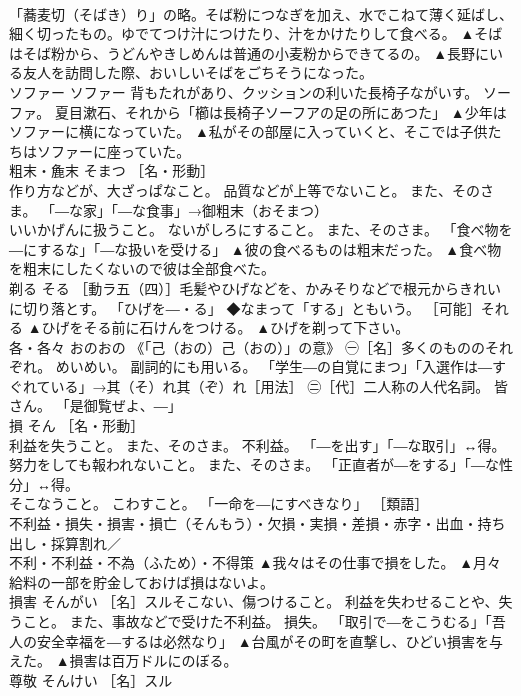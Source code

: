 \documentclass[8pt]{extreport}
\begin{document}
\begin{CJK}{UTF8}{min}
\\	「蕎麦切（そばき）り」の略。そば粉につなぎを加え、水でこねて薄く延ばし、細く切ったもの。ゆでてつけ汁につけたり、汁をかけたりして食べる。	▲そばはそば粉から、うどんやきしめんは普通の小麦粉からできてるの。 ▲長野にいる友人を訪問した際、おいしいそばをごちそうになった。
\\	ソファー	ソファー	背もたれがあり、クッションの利いた長椅子ながいす。 ソーファ。 夏目漱石、それから「櫛は長椅子ソーフアの足の所にあつた」	▲少年はソファーに横になっていた。 ▲私がその部屋に入っていくと、そこでは子供たちはソファーに座っていた。
\\	粗末・麁末	そまつ	［名・形動］ 
\\	作り方などが、大ざっぱなこと。 品質などが上等でないこと。 また、そのさま。 「―な家」「―な食事」→御粗末（おそまつ） 
\\	いいかげんに扱うこと。 ないがしろにすること。 また、そのさま。 「食べ物を―にするな」「―な扱いを受ける」	▲彼の食べるものは粗末だった。 ▲食べ物を粗末にしたくないので彼は全部食べた。
\\	剃る	そる	［動ラ五（四）］毛髪やひげなどを、かみそりなどで根元からきれいに切り落とす。 「ひげを―・る」 ◆なまって「する」ともいう。 ［可能］それる	▲ひげをそる前に石けんをつける。 ▲ひげを剃って下さい。
\\	各・各々	おのおの	《「己（おの）己（おの）」の意》 ㊀［名］多くのもののそれぞれ。 めいめい。 副詞的にも用いる。 「学生―の自覚にまつ」「入選作は―すぐれている」→其（そ）れ其（ぞ）れ［用法］ ㊁［代］二人称の人代名詞。 皆さん。 「是御覧ぜよ、―」	
\\	損	そん	［名・形動］ 
\\	利益を失うこと。 また、そのさま。 不利益。 「―を出す」「―な取引」↔得。 
\\	努力をしても報われないこと。 また、そのさま。 「正直者が―をする」「―な性分」↔得。 
\\	そこなうこと。 こわすこと。 「一命を―にすべきなり」 ［類語］
\\	不利益・損失・損害・損亡（そんもう）・欠損・実損・差損・赤字・出血・持ち出し・採算割れ／
\\	不利・不利益・不為（ふため）・不得策	▲我々はその仕事で損をした。 ▲月々給料の一部を貯金しておけば損はないよ。
\\	損害	そんがい	［名］スルそこない、傷つけること。 利益を失わせることや、失うこと。 また、事故などで受けた不利益。 損失。 「取引で―をこうむる」「吾人の安全幸福を―するは必然なり」	▲台風がその町を直撃し、ひどい損害を与えた。 ▲損害は百万ドルにのぼる。
\\	尊敬	そんけい	［名］スル 

\end{CJK}
\end{document}
